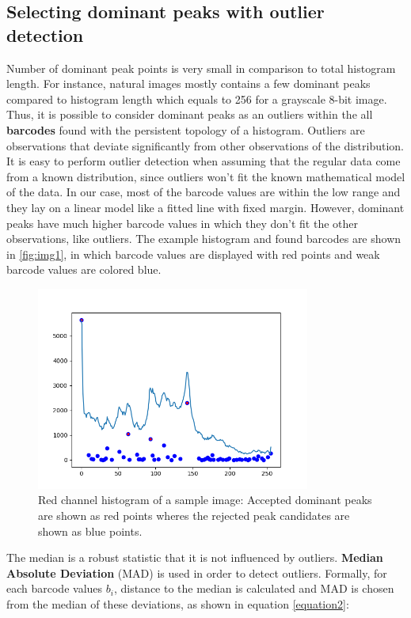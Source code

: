 \documentclass[12pt]{extarticle}
\begin{document}
\subsection{Selecting dominant peaks with outlier detection}
 Number of dominant peak points is very small in comparison to total histogram length. For instance, natural images mostly contains a few dominant peaks compared to histogram length which equals to 256 for a grayscale 8-bit image. Thus, it is possible to consider dominant peaks as an outliers within the all \textbf{barcodes} found with the persistent topology of a histogram. Outliers are observations that deviate significantly from other observations of the distribution. It is easy to perform outlier detection when assuming that the regular data come from a known distribution, since outliers won't fit the known mathematical model of the data. In our case, most of the barcode values are within the low range and they lay on a linear model like a fitted line with fixed margin. However, dominant peaks have much higher barcode values in which they don't fit the other observations, like outliers. The example histogram and found barcodes are shown in \ref{fig:img1}, in which barcode values are displayed with red points and weak barcode values are colored blue.
 \begin{figure}
\centering     %
\includegraphics[width=90mm]{Figure_2.png}
\caption{ Red channel histogram of a sample image: Accepted dominant peaks are shown as red points wheres the rejected peak candidates are shown as blue points.}
 \label{fig:img2}
\end{figure}

 The median is a robust statistic that it is not influenced by outliers. \textbf{Median Absolute Deviation} (MAD) is used in order to detect outliers. Formally, for each barcode values $b_i$, distance to the median is calculated and MAD is chosen from the median of these deviations, as shown in equation \eqref{equation2}:
 
\end{document}
